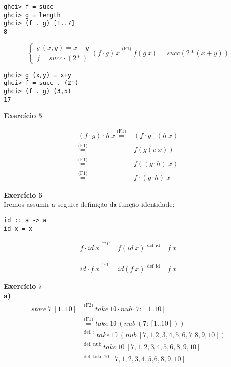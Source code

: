\documentclass[a4paper,11pt]{article}
\begin{document}
\begin{verbatim}
ghci> f = succ
ghci> g = length
ghci> (f . g) [1..7]
8
\end{verbatim}
\[
\begin{cases}
	g \  (x,y) = x + y \\
	f = succ \cdot (2*)
\end{cases}
(f \cdot g) \  x \overset{\text{(F1)}}{=} f (g \  x) = succ (2 * (x + y))
\]

\begin{verbatim}
ghci> g (x,y) = x+y
ghci> f = succ . (2*)
ghci> (f . g) (3,5)
17
\end{verbatim}


\noindent \textbf{Exercício 5}

\[
\begin{aligned}
	(f \cdot g) \cdot h \  x
	\overset{\text{(F1)}}{=}& (f \cdot g)(h \  x) \\
	\overset{\text{(F1)}}{=}& f(g(h \  x)) \\
	\overset{\text{(F1)}}{=}& f ((g \cdot h) \  x) \\
	\overset{\text{(F1)}}{=}& f \cdot (g \cdot h) \  x
\end{aligned}
\]

\newpage

\noindent \textbf{Exercício 6}\\

\noindent Iremos assumir a seguite definição da função identidade:
\begin{verbatim}
id :: a -> a
id x = x
\end{verbatim}
\[
\begin{aligned}
	f \cdot id \  x 
	\overset{\text{(F1)}}{=}& f(id \  x)
	\overset{\text{def. id}}{=}& f \  x
\end{aligned}
\]

\[
\begin{aligned}
	id \cdot f \  x 
	\overset{\text{(F1)}}{=}& id(f \  x)
	\overset{\text{def. id}}{=}& f \  x
\end{aligned}
\]

\noindent \textbf{Exercício 7}\\

\noindent \textbf{a)}
\[
\begin{aligned}
	store \  7 \  [1..10] &\overset{\text{(F2)}}{=} take \  10 \cdot nub \cdot 7:[1..10] \\
	&\overset{\text{(F1)}}{=} take \  10 \  (nub \  (7 : [1..10])) \\
	&\overset{\text{def. :}}{=} take \  10 \  (nub \  [7,1,2,3,4,5,6,7,8,9,10]) \\
	&\overset{\text{def. nub}}{=} take \  10 \  [7,1,2,3,4,5,6,8,9,10] \\
	&\overset{\text{def. take 10}}{=} [7,1,2,3,4,5,6,8,9,10] \\
\end{aligned}
\]
\end{document}
